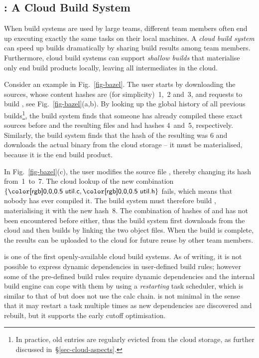 \subsection{\Bazel: A Cloud Build System}\label{sec-background-bazel}

When build systems are used by large teams, different team members often end up
executing exactly the same tasks on their local machines. A \emph{cloud build
system} can speed up builds dramatically by sharing build results
among team members. Furthermore, cloud build systems can support \emph{shallow
builds} that materialise only end build products locally, leaving all
intermediates in the cloud.

Consider an example in Fig.~\ref{fig-bazel}. The user starts by downloading the
sources, whose content hashes are (for simplicity)~1,~2 and~3, and requests to
build , see Fig.~\ref{fig-bazel}(a,b). By looking up the global
history of all previous builds\footnote{In practice, old entries are regularly
evicted from the cloud storage, as further discussed
in~\S\ref{sec-cloud-aspects}.}, the build system finds that someone has already
compiled these exact sources before and the resulting files  and
 had hashes 4~and~5, respectively. Similarly, the build system finds
that the hash of the resulting  was 6 and downloads the actual
binary from the cloud storage -- it must be materialised, because it is the end
build product.

In Fig.~\ref{fig-bazel}(c), the user modifies the source file ,
thereby changing its hash from~1~to~7. The cloud lookup of the new combination
$\{\cmd{util.c}, \cmd{util.h}\}$ fails, which means that nobody has ever
compiled it. The build system must therefore build , materialising
it with the new hash~8. The combination of hashes of  and
 has not been encountered before either, thus the build system first
downloads  from the cloud and then builds  by linking
the two object files. When the build is complete, the results can be uploaded to
the cloud for future reuse by other team members.

\Bazel is one of the first openly-available cloud build systems.
As of writing, it is not possible to express dynamic dependencies in
user-defined build rules; however some of the pre-defined build rules require
dynamic dependencies and the internal build engine can cope with them by using
a \emph{restarting} task scheduler, which is similar to that of \Excel but does
not use the calc chain. \Bazel is not minimal in the sense that it may restart a
task multiple times as new dependencies are discovered and rebuilt, but it
supports the early cutoff optimisation.

